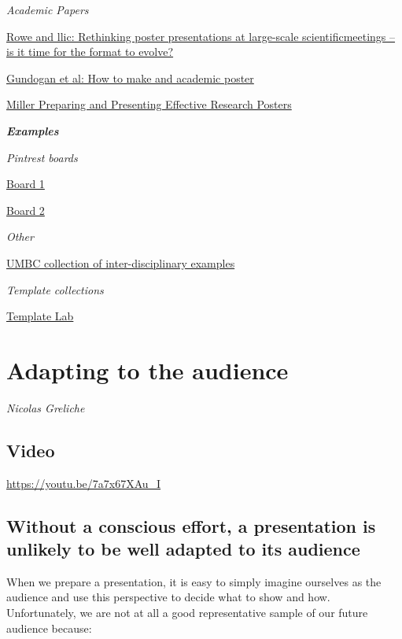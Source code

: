 \documentclass[
  titlepage]{book}
\begin{document}
\emph{Academic Papers}

\href{https://febs.onlinelibrary.wiley.com/doi/epdf/10.1111/febs.13383}{Rowe and llic: Rethinking poster presentations at large-scale scientiﬁcmeetings -- is it time for the format to evolve?}

\href{https://www.sciencedirect.com/science/article/pii/S2049080116301303}{Gundogan et al: How to make and academic poster}

\href{https://www.ncbi.nlm.nih.gov/pmc/articles/PMC1955747/}{Miller Preparing and Presenting Effective Research Posters}

\textbf{\emph{Examples}}

\emph{Pintrest boards}

\href{https://www.pinterest.co.uk/jing4717/academic-poster/}{Board 1}

\href{https://www.pinterest.at/tzesire/conference-posters-design/}{Board 2}

\emph{Other}

\href{https://ur.umbc.edu/poster-presentation-examples/}{UMBC collection of inter-disciplinary examples}

\emph{Template collections}

\href{https://templatelab.com/research-posters/}{Template Lab}

\hypertarget{audience1}{%
\chapter{Adapting to the audience}\label{audience1}}

\emph{Nicolas Greliche}

\hypertarget{video-5}{%
\section{Video}\label{video-5}}

\label{fig:unnamed-chunk-41}\url{https://youtu.be/7a7x67XAu_I}

\hypertarget{without-a-conscious-effort-a-presentation-is-unlikely-to-be-well-adapted-to-its-audience}{%
\section{Without a conscious effort, a presentation is unlikely to be well adapted to its audience}\label{without-a-conscious-effort-a-presentation-is-unlikely-to-be-well-adapted-to-its-audience}}

When we prepare a presentation, it is easy to simply imagine ourselves as the audience and use this perspective to decide what to show and how. Unfortunately, we are not at all a good representative sample of our future audience because:
\end{document}
